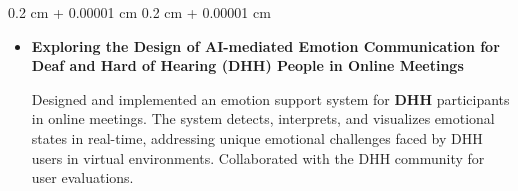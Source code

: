 \documentclass[10pt, letterpaper]{article}
\newenvironment{highlights}{
    \begin{itemize}[
        topsep=0.10 cm,
        parsep=0.10 cm,
        partopsep=0pt,
        itemsep=0pt,
        leftmargin=0.4 cm + 10pt
    ]
}{
    \end{itemize}
} %
\newenvironment{onecolentry}{
    \begin{adjustwidth}{
        0.2 cm + 0.00001 cm
    }{
        0.2 cm + 0.00001 cm
    }
}{
    \end{adjustwidth}
} %
\begin{document}
\begin{onecolentry}
\begin{highlights}
                \item \textbf{Exploring the Design of AI-mediated Emotion Communication for Deaf and Hard of Hearing (DHH) People in Online Meetings}

                Designed and implemented an emotion support system for \textbf{DHH} participants in online meetings. The system detects, interprets, and visualizes emotional states in real-time, addressing unique emotional challenges faced by DHH users in virtual environments. Collaborated with the DHH community for user evaluations.
                

\end{highlights}
\end{onecolentry}
\end{document}
